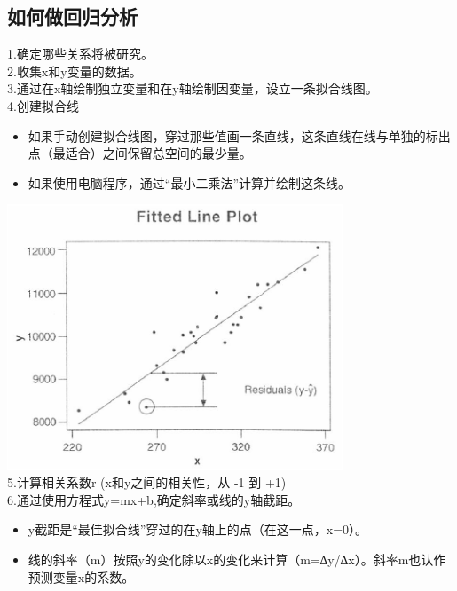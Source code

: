 \hypertarget{ux5982ux4f55ux505aux56deux5f52ux5206ux6790}{%
\subsection{如何做回归分析}\label{ux5982ux4f55ux505aux56deux5f52ux5206ux6790}}


1.确定哪些关系将被研究。\\

2.收集x和y变量的数据。\\

3.通过在x轴绘制独立变量和在y轴绘制因变量，设立一条拟合线图。\\

4.创建拟合线\\


\begin{itemize}
\tightlist
\item
  如果手动创建拟合线图，穿过那些值画一条直线，这条直线在线与单独的标出点（最适合）之间保留总空间的最少量。
\item
  如果使用电脑程序，通过``最小二乘法''计算并绘制这条线。
\end{itemize}


\includegraphics[width=10cm]{相关性09.png}\\

5.计算相关系数r (x和y之间的相关性，从 -1 到 +1)\\

6.通过使用方程式y=mx+b,确定斜率或线的y轴截距。\\


\begin{itemize}
\tightlist
\item
  y截距是``最佳拟合线''穿过的在y轴上的点（在这一点，x=0）。
\item
  线的斜率（m）按照y的变化除以x的变化来计算（m=∆y/∆x）。斜率m也认作预测变量x的系数。
\end{itemize}


